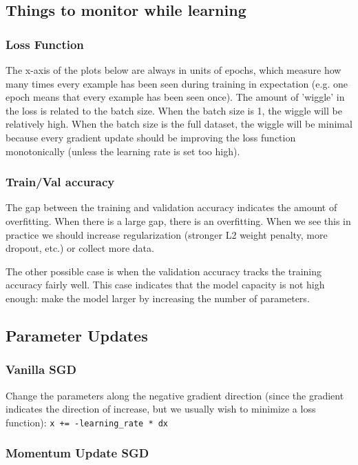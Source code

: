 \documentclass[letterpaper]{article}
\begin{document}
\subsection{Things to monitor while learning}

\subsubsection{Loss Function}

The x-axis of the plots below are always in units of epochs, which measure how many times every example has been seen during training in expectation (e.g. one epoch means that every example has been seen once). The amount of 'wiggle' in the loss is related to the batch size. When the batch size is 1, the wiggle will be relatively high. When the batch size is the full dataset, the wiggle will be minimal because every gradient update should be improving the loss function monotonically (unless the learning rate is set too high).

\subsubsection{Train/Val accuracy}

The gap between the training and validation accuracy indicates the amount of overfitting. When there is a large gap, there is an overfitting. When we see this in practice we should increase regularization (stronger L2 weight penalty, more dropout, etc.) or collect more data. 

The other possible case is when the validation accuracy tracks the training accuracy fairly well. This case indicates that the model capacity is not high enough: make the model larger by increasing the number of parameters.

\subsection{Parameter Updates}

\subsubsection{Vanilla SGD}

Change the parameters along the negative gradient direction (since the gradient indicates the direction of increase, but we usually wish to minimize a loss function): \texttt{x += -learning\_rate * dx}

\subsubsection{Momentum Update SGD}
\end{document}
